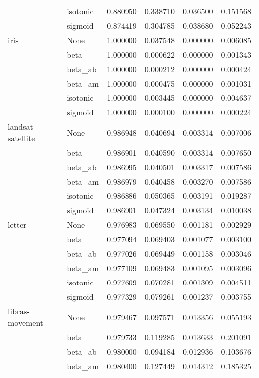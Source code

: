 \begin{tabular}{llrrrr}
        & isotonic &  0.880950 &  0.338710 &  0.036500 &  0.151568 \\
        & sigmoid &  0.874419 &  0.304785 &  0.038680 &  0.052243 \\
iris & None &  1.000000 &  0.037548 &  0.000000 &  0.006085 \\
        & beta &  1.000000 &  0.000622 &  0.000000 &  0.001343 \\
        & beta\_ab &  1.000000 &  0.000212 &  0.000000 &  0.000424 \\
        & beta\_am &  1.000000 &  0.000475 &  0.000000 &  0.001031 \\
        & isotonic &  1.000000 &  0.003445 &  0.000000 &  0.004637 \\
        & sigmoid &  1.000000 &  0.000100 &  0.000000 &  0.000224 \\
landsat-satellite & None &  0.986948 &  0.040694 &  0.003314 &  0.007006 \\
        & beta &  0.986901 &  0.040590 &  0.003314 &  0.007650 \\
        & beta\_ab &  0.986995 &  0.040501 &  0.003317 &  0.007586 \\
        & beta\_am &  0.986979 &  0.040458 &  0.003270 &  0.007586 \\
        & isotonic &  0.986886 &  0.050365 &  0.003191 &  0.019287 \\
        & sigmoid &  0.986901 &  0.047324 &  0.003134 &  0.010038 \\
letter & None &  0.976983 &  0.069550 &  0.001181 &  0.002929 \\
        & beta &  0.977094 &  0.069403 &  0.001077 &  0.003100 \\
        & beta\_ab &  0.977026 &  0.069449 &  0.001158 &  0.003046 \\
        & beta\_am &  0.977109 &  0.069483 &  0.001095 &  0.003096 \\
        & isotonic &  0.977609 &  0.070281 &  0.001309 &  0.004511 \\
        & sigmoid &  0.977329 &  0.079261 &  0.001237 &  0.003755 \\
libras-movement & None &  0.979467 &  0.097571 &  0.013356 &  0.055193 \\
        & beta &  0.979733 &  0.119285 &  0.013633 &  0.201091 \\
        & beta\_ab &  0.980000 &  0.094184 &  0.012936 &  0.103676 \\
        & beta\_am &  0.980400 &  0.127449 &  0.014312 &  0.185325 \\

\end{tabular}
